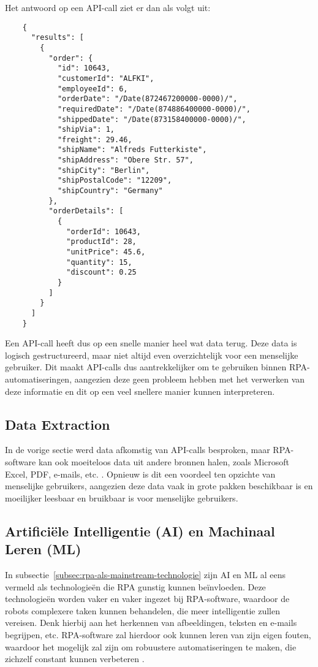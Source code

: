 Het antwoord op een API-call ziet er dan als volgt uit:
\begin{verbatim}
    {
      "results": [
        {
          "order": {
            "id": 10643,
            "customerId": "ALFKI",
            "employeeId": 6,
            "orderDate": "/Date(872467200000-0000)/",
            "requiredDate": "/Date(874886400000-0000)/",
            "shippedDate": "/Date(873158400000-0000)/",
            "shipVia": 1,
            "freight": 29.46,
            "shipName": "Alfreds Futterkiste",
            "shipAddress": "Obere Str. 57",
            "shipCity": "Berlin",
            "shipPostalCode": "12209",
            "shipCountry": "Germany"
          },
          "orderDetails": [
            {
              "orderId": 10643,
              "productId": 28,
              "unitPrice": 45.6,
              "quantity": 15,
              "discount": 0.25
            }
          ]
        }
      ]
    }
\end{verbatim}
Een API-call heeft dus op een snelle manier heel wat data terug. Deze data is logisch gestructureerd, maar niet altijd even overzichtelijk voor een menselijke gebruiker. Dit maakt API-calls dus aantrekkelijker om te gebruiken binnen RPA-automatiseringen, aangezien deze geen probleem hebben met het verwerken van deze informatie en dit op een veel snellere manier kunnen interpreteren.


\subsection{Data Extraction}
\label{subsec:data-extraction}

In de vorige sectie werd data afkomstig van API-calls besproken, maar RPA-software kan ook moeiteloos data uit andere bronnen halen, zoals Microsoft Excel, PDF, e-mails, etc. \autocite{Andrade2022}. Opnieuw is dit een voordeel ten opzichte van menselijke gebruikers, aangezien deze data vaak in grote pakken beschikbaar is en moeilijker leesbaar en bruikbaar is voor menselijke gebruikers.

\subsection{Artificiële Intelligentie (AI) en Machinaal Leren (ML)}
\label{subsec:ai-en-ml}

In subsectie~\ref{subsec:rpa-als-mainstream-technologie} zijn AI en ML al eens vermeld als technologieën die RPA gunstig kunnen beïnvloeden. Deze technologieën worden vaker en vaker ingezet bij RPA-software, waardoor de robots complexere taken kunnen behandelen, die meer intelligentie zullen vereisen. Denk hierbij aan het herkennen van afbeeldingen, teksten en e-mails begrijpen, etc. RPA-software zal hierdoor ook kunnen leren van zijn eigen fouten, waardoor het mogelijk zal zijn om robuustere automatiseringen te maken, die zichzelf constant kunnen verbeteren \autocite{Taulli2020}.

